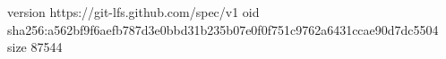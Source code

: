 version https://git-lfs.github.com/spec/v1
oid sha256:a562bf9f6aefb787d3e0bbd31b235b07e0f0f751c9762a6431ccae90d7dc5504
size 87544

